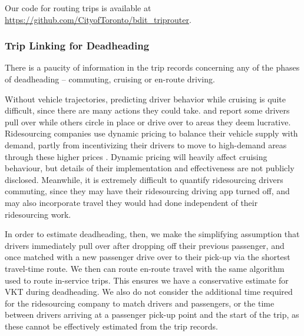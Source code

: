 \documentclass[]{trbunofficial_bdit_final}
\begin{document}
\noindent Our code for routing trips is available at
\url{https://github.com/CityofToronto/bdit_triprouter}.

\hypertarget{sec:triplinking}{%
\subsubsection{Trip Linking for Deadheading}\label{sec:triplinking}}

There is a paucity of information in the trip records concerning any of the
phases of deadheading -- commuting, cruising or en-route driving.

Without vehicle trajectories, predicting driver behavior while cruising is
quite difficult, since there are many actions they could take.
 and  report some
drivers pull over while others circle in place or drive over to areas they deem
lucrative. Ridesourcing companies use dynamic pricing to balance their
vehicle supply with demand, partly from incentivizing their drivers to move to
high-demand areas through these higher prices \cite{gurley2014dynamic,
ubervideo}. Dynamic pricing will heavily affect cruising behaviour, but details
of their implementation and effectiveness are not publicly disclosed.
Meanwhile, it is extremely difficult to quantify ridesourcing drivers
commuting, since they may have their ridesourcing driving app turned off, and
may also incorporate travel they would had done independent of their
ridesourcing work.

In order to estimate deadheading, then, we make the simplifying assumption that
drivers immediately pull over after dropping off their previous passenger, and
once matched with a new passenger drive over to their pick-up via the shortest
travel-time route. We then can route en-route travel with the same algorithm
used to route in-service trips. This ensures we have a conservative estimate
for VKT during deadheading. We also do not consider the additional time
required for the ridesourcing company to match drivers and passengers, or the
time between drivers arriving at a passenger pick-up point and the start of the
trip, as these cannot be effectively estimated from the trip records.
\end{document}
